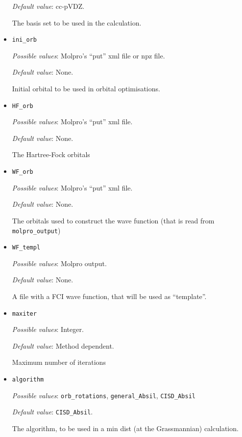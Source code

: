 \begin{itemize}
  \emph{Default value}: cc-pVDZ.

  The basis set to be used in the calculation.


\item \verb+ini_orb+

  \emph{Possible values}: Molpro's ``put'' xml file or npz file.

  \emph{Default value}: None.
  
  Initial orbital to be used in orbital optimisations.
  
\item \verb+HF_orb+

  \emph{Possible values}: Molpro's ``put'' xml file.

  \emph{Default value}: None.

  The Hartree-Fock orbitals

\item \verb+WF_orb+

  \emph{Possible values}: Molpro's ``put'' xml file.

  \emph{Default value}: None.
  
  The orbitals used to construct the wave function (that is read from \verb+molpro_output+)
  
\item \verb+WF_templ+

  \emph{Possible values}: Molpro output.

  \emph{Default value}: None.
  
  A file with a FCI wave function, that will be used as ``template''.
  
\item \verb+maxiter+

  \emph{Possible values}: Integer.

  \emph{Default value}: Method dependent.

  Maximum number of iterations

\item \verb+algorithm+

  \emph{Possible values}: \verb+orb_rotations+, \verb+general_Absil+, \verb+CISD_Absil+

  \emph{Default value}: \verb+CISD_Absil+.

  The algorithm, to be used in a min dist (at the Grassmannian) calculation.


\end{itemize}
